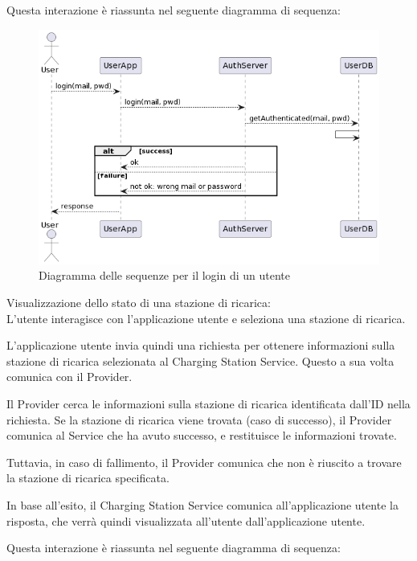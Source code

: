 Questa interazione è riassunta nel seguente diagramma di sequenza:
\begin{figure}[htbp]
    \centering
    \includegraphics[width=\textwidth]{images/login.png}
    \caption{Diagramma delle sequenze per il login di un utente}
    \label{fig:login}
\end{figure}

Visualizzazione dello stato di una stazione di ricarica:\\
L'utente interagisce con l'applicazione utente e seleziona una stazione di ricarica.

L'applicazione utente invia quindi una richiesta per ottenere informazioni sulla stazione di ricarica selezionata al Charging Station Service. Questo a sua volta comunica con il Provider.

Il Provider cerca le informazioni sulla stazione di ricarica identificata dall'ID nella richiesta. Se la stazione di ricarica viene trovata (caso di successo), il Provider comunica al Service che ha avuto successo, e restituisce le informazioni trovate.

Tuttavia, in caso di fallimento, il Provider comunica che non è riuscito a trovare la stazione di ricarica specificata.

In base all'esito, il Charging Station Service comunica all'applicazione utente la risposta, che verrà quindi visualizzata all'utente dall'applicazione utente.

Questa interazione è riassunta nel seguente diagramma di sequenza:

